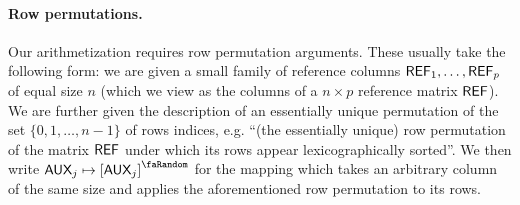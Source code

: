 \paragraph{Row permutations.} Our arithmetization requires row permutation arguments. These usually take the following form: we are given a small family of reference columns $\textsf{REF}_1,\dots,\textsf{REF}_p$ of equal size $n$ (which we view as the columns of a $n\times p$ reference matrix $\textsf{REF}$). We are further given the description of an essentially unique permutation of the set $\{0,1,\dots,n-1\}$ of rows indices, e.g. ``(the essentially unique) row permutation of the matrix $\textsf{REF}$ under which its rows appear lexicographically sorted''. We then write $\col{AUX}_j\mapsto\order{\col{AUX}_j}$ for the mapping which takes an arbitrary column of the same size and applies the aforementioned row permutation to its rows.
